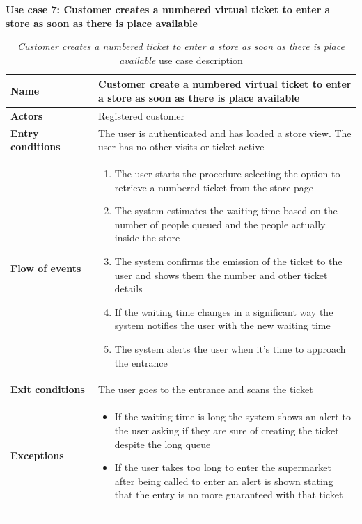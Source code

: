 \clearpage
\textbf{Use case 7: Customer creates a numbered virtual ticket to enter a store as soon as there is place available}
\smallskip
{}
\begin{longtable}{p{0.25\linewidth}p{0.75\linewidth}}
    \toprule
    \textbf{Name}             & \textbf{Customer create a numbered virtual ticket to enter a store as soon as there is place available} \\
    \midrule
    \textbf{Actors}           & Registered customer                                                                                     \\
    \midrule
    \textbf{Entry conditions} & The user is authenticated and has loaded a store view. The user has no other visits or ticket active    \\
    \midrule
    \textbf{Flow of events}   &
    \begin{enumerate}
        \item The user starts the procedure selecting the option to retrieve a numbered ticket from the store page
        \item The system estimates the waiting time based on the number of people queued and the people actually inside the store
        \item The system confirms the emission of the ticket to the user and shows them the number and other ticket details
        \item If the waiting time changes in a significant way the system notifies the user with the new waiting time
        \item The system alerts the user when it's time to approach the entrance
    \end{enumerate}                                                                                                          \\
    \midrule
    \textbf{Exit conditions}  & The user goes to the entrance and scans the ticket                                                      \\
    \midrule
    \textbf{Exceptions}       &
    \begin{itemize}
        \item If the waiting time is long the system shows an alert to the user asking if they are sure of creating the ticket despite the long queue
        \item If the user takes too long to enter the supermarket after being called to enter an alert is shown stating that the entry is no more guaranteed with that ticket

    \end{itemize}                                                                                                          \\
    \bottomrule
    \caption{\emph{Customer creates a numbered ticket to enter a store as soon as there is place available} use case description}
\end{longtable}

